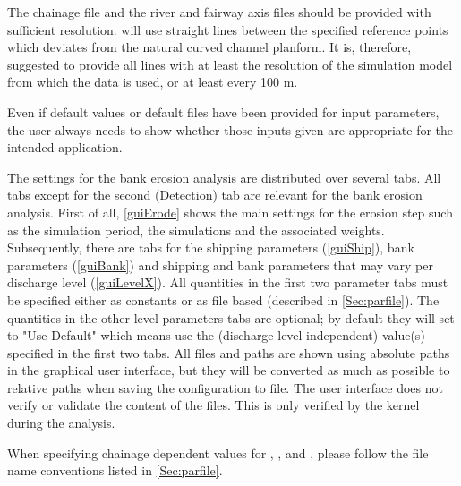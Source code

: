 \Note The chainage file and the river and fairway axis files should be provided with sufficient resolution.
\dfastbe will use straight lines between the specified reference points which deviates from the natural curved channel planform.
It is, therefore, suggested to provide all lines with at least the resolution of the simulation model from which the data is used, or at least every 100 m.

\Note Even if default values or default files have been provided for input parameters, the user always needs to show whether those inputs given are appropriate for the intended application.

The settings for the bank erosion analysis are distributed over several tabs.
All tabs except for the second (Detection) tab are relevant for the bank erosion analysis.
First of all, \autoref{guiErode} shows the main settings for the erosion step such as the simulation period, the simulations and the associated weights.
Subsequently, there are tabs for the shipping parameters (\autoref{guiShip}), bank parameters (\autoref{guiBank}) and shipping and bank parameters that may vary per discharge level (\autoref{guiLevelX}).
All quantities in the first two parameter tabs must be specified either as constants or as file based (described in \autoref{Sec:parfile}).
The quantities in the other level parameters tabs are optional; by default they will set to "Use Default" which means use the (discharge level independent) value(s) specified in the first two tabs.
All files and paths are shown using absolute paths in the graphical user interface, but they will be converted as much as possible to relative paths when saving the configuration to file.
The user interface does not verify or validate the content of the files.
This is only verified by the kernel during the analysis.

\Note When specifying chainage dependent values for , ,  and , please follow the file name conventions listed in \autoref{Sec:parfile}.


